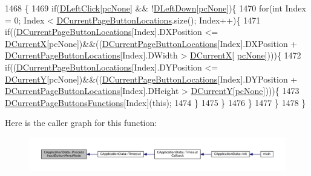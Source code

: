 \begin{DoxyCode}
1468                                                  \{
1469     \textcolor{keywordflow}{if}(\hyperlink{classCApplicationData_a8a86bb4c7cba7b119121401dda4ca68b}{DLeftClick}[\hyperlink{GameDataTypes_8h_aafb0ca75933357ff28a6d7efbdd7602fa88767aa8e02c7b3192bbab4127b3d729}{pcNone}] && !\hyperlink{classCApplicationData_a2b943f18557c3e4c8cd4550e22e028b6}{DLeftDown}[\hyperlink{GameDataTypes_8h_aafb0ca75933357ff28a6d7efbdd7602fa88767aa8e02c7b3192bbab4127b3d729}{pcNone}])\{
1470         \textcolor{keywordflow}{for}(\textcolor{keywordtype}{int} Index = 0; Index < \hyperlink{classCApplicationData_a3615df8e23cea3ce17f11cf61340a7b4}{DCurrentPageButtonLocations}.size(); Index++)\{
1471             \textcolor{keywordflow}{if}((\hyperlink{classCApplicationData_a3615df8e23cea3ce17f11cf61340a7b4}{DCurrentPageButtonLocations}[Index].DXPosition <= 
      \hyperlink{classCApplicationData_a1dc7ee482a39f7978c71365ac540f97a}{DCurrentX}[pcNone])&&((\hyperlink{classCApplicationData_a3615df8e23cea3ce17f11cf61340a7b4}{DCurrentPageButtonLocations}[Index].DXPosition + 
      \hyperlink{classCApplicationData_a3615df8e23cea3ce17f11cf61340a7b4}{DCurrentPageButtonLocations}[Index].DWidth > \hyperlink{classCApplicationData_a1dc7ee482a39f7978c71365ac540f97a}{DCurrentX}[
      \hyperlink{GameDataTypes_8h_aafb0ca75933357ff28a6d7efbdd7602fa88767aa8e02c7b3192bbab4127b3d729}{pcNone}])))\{
1472                 \textcolor{keywordflow}{if}((\hyperlink{classCApplicationData_a3615df8e23cea3ce17f11cf61340a7b4}{DCurrentPageButtonLocations}[Index].DYPosition <= 
      \hyperlink{classCApplicationData_a0ba39779ae11c8072258c6ddfebd6052}{DCurrentY}[pcNone])&&((\hyperlink{classCApplicationData_a3615df8e23cea3ce17f11cf61340a7b4}{DCurrentPageButtonLocations}[Index].DYPosition + 
      \hyperlink{classCApplicationData_a3615df8e23cea3ce17f11cf61340a7b4}{DCurrentPageButtonLocations}[Index].DHeight > 
      \hyperlink{classCApplicationData_a0ba39779ae11c8072258c6ddfebd6052}{DCurrentY}[\hyperlink{GameDataTypes_8h_aafb0ca75933357ff28a6d7efbdd7602fa88767aa8e02c7b3192bbab4127b3d729}{pcNone}])))\{
1473                     \hyperlink{classCApplicationData_ad3079e5563a19d21c1e4ceff2a188382}{DCurrentPageButtonsFunctions}[Index](\textcolor{keyword}{this});
1474                 \}
1475             \}
1476         \}
1477     \}   
1478 \}
\end{DoxyCode}
Here is the caller graph for this function\+:\nopagebreak
\begin{figure}[H]
\begin{center}
\leavevmode
\includegraphics[width=350pt]{classCApplicationData_a10e56e4604f1f0823af659a7989fea9d_icgraph}
\end{center}
\end{figure}
